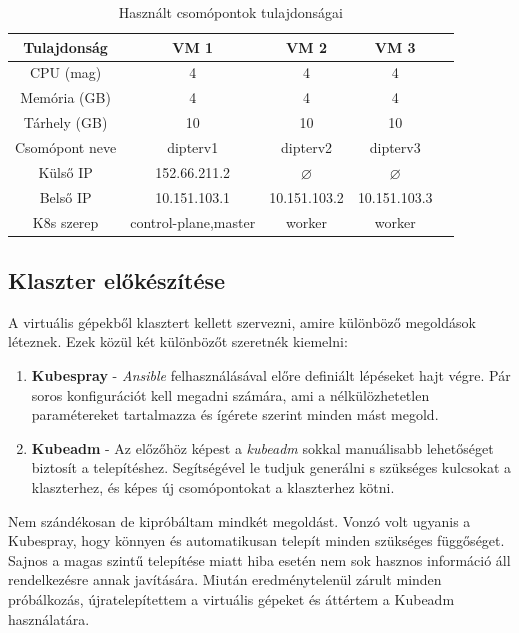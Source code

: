 \begin{table}[ht]
\centering
  \begin{tabular}{c|cccc}
	  Tulajdonság & VM 1 & VM 2 & VM 3 \\
    \hline
	CPU (mag) & 4 & 4 & 4 \\ 
	Memória (GB) & 4 & 4 & 4 \\
	Tárhely (GB) & 10 & 10 & 10 \\  
	Csomópont neve & dipterv1 & dipterv2 & dipterv3 \\ 
	Külső IP & 152.66.211.2 & $\varnothing$ & $\varnothing$ \\ 
	Belső IP & 10.151.103.1 & 10.151.103.2 & 10.151.103.3 \\
	K8s szerep& control-plane,master & worker & worker \\
  \end{tabular}
  
  \caption{Használt csomópontok tulajdonságai}
\label{tab:nodes}
\end{table}

\subsection{Klaszter előkészítése}
A virtuális gépekből klasztert kellett szervezni, amire különböző megoldások léteznek.\citep{kubernetesInstall} 
Ezek közül két különbözőt szeretnék kiemelni:

\begin{enumerate}

  \item \textbf{Kubespray} - \textit{Ansible} felhasználásával előre definiált lépéseket hajt végre. Pár soros konfigurációt kell megadni számára, ami a nélkülözhetetlen paramétereket tartalmazza és ígérete szerint minden mást megold.
  
  \item \textbf{Kubeadm} - Az előzőhöz képest a \textit{kubeadm} sokkal manuálisabb lehetőséget biztosít a telepítéshez. 
  Segítségével le tudjuk generálni s szükséges kulcsokat a klaszterhez, és képes új csomópontokat a klaszterhez kötni.
  
\end{enumerate}

Nem szándékosan de kipróbáltam mindkét megoldást.
Vonzó volt ugyanis a Kubespray, hogy könnyen és automatikusan telepít minden szükséges függőséget. 
Sajnos a magas szintű telepítése miatt hiba esetén nem sok hasznos információ áll rendelkezésre annak javítására.
Miután eredménytelenül zárult minden próbálkozás, újratelepítettem a virtuális gépeket és áttértem a Kubeadm használatára. 

